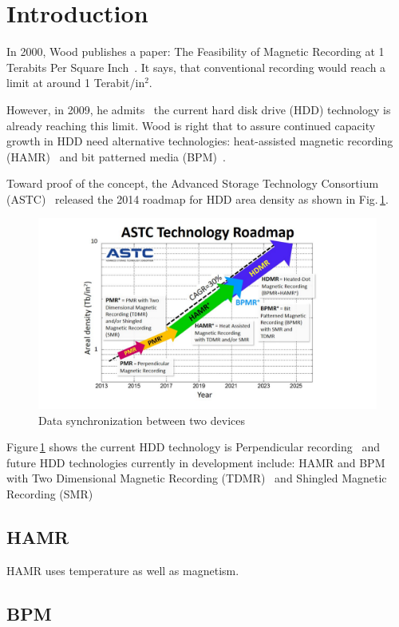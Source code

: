 \section{Introduction}
In 2000, Wood publishes a paper: The Feasibility of Magnetic Recording at 1 Terabits Per Square Inch~\cite{Wood2000}. It says, that conventional recording would reach a limit at around 1 Terabit/in$^2$.

However, in 2009, he admits~\cite{Wood2009} the current hard disk drive (HDD) technology is already reaching this limit. Wood is right that to assure continued capacity growth in HDD need alternative technologies: heat-assisted magnetic recording (HAMR)~\cite{Rottmeyer} and bit patterned media (BPM)~\cite{Terris}. 

Toward proof of the concept, the Advanced Storage Technology Consortium (ASTC)~\cite{ASTC} released the 2014 roadmap for HDD area density as shown in Fig.\,\ref{fig_astc}.

\begin{figure}[!hbt]
\includegraphics[height=0.25\textheight]{ASTC}
\caption{Data synchronization between two devices}
\label{fig_astc}
\end{figure}

Figure\,\ref{fig_astc} shows the current HDD technology is Perpendicular recording~\cite{HGST} and future HDD technologies currently in development include: HAMR and BPM with Two Dimensional Magnetic Recording (TDMR)~\cite{Krishnan} and Shingled Magnetic Recording (SMR)~\cite{Gibson}

\subsection{HAMR} 
HAMR uses temperature as well as magnetism.

\subsection{BPM}


